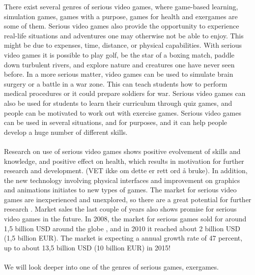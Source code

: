 There exist several genres of serious video games, where game-based learning, simulation games, games with a purpose, games for health and exergames are some of them. Serious video games also provide the opportunity to experience real-life situations and adventures one may otherwise not be able to enjoy. This might be due to expenses, time, distance, or physical capabilities. With serious video games it is possible to play golf, be the star of a boxing match, paddle down turbulent rivers, and explore nature and creatures one have never seen before. In a more serious matter, video games can be used to simulate brain surgery or a battle in a war zone. This can teach students how to perform medical procedures or it could prepare soldiers for war. Serious video games can also be used for students to learn their curriculum through quiz games, and people can be motivated to work out with exercise games. Serious video games can be used in several situations, and for purposes, and it can help people develop a huge number of different skills. \\ \\
Research on use of serious video games shows positive evolvement of skills and knowledge, and positive effect on health, which results in motivation for further research and development. (VET ikke om dette er rett ord å bruke). In addition, the new technology involving physical interfaces and improvement on graphics and animations initiates to new types of games. The market for serious video games are inexperienced and unexplored, so there are a great potential for further research \cite{alfingewang}. Market sales the last couple of years also shows promise for serious video games in the future. In 2008, the market for serious games sold for around 1,5 billion USD around the globe \cite{alfingewang}, and in 2010 it reached about 2 billion USD (1,5 billion EUR). The market is expecting a annual growth rate of 47 percent, up to about 13,5 billion USD (10 billion EUR) in 2015! \cite{idate} \\ \\
We will look deeper into one of the genres of serious games, exergames.  
